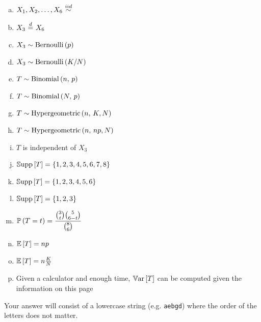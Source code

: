 \documentclass[12pt,landscape]{article}
\newcommand{\instr}{\small Your answer will consist of a lowercase string (e.g. \texttt{aebgd}) where the order of the letters does not matter. \normalsize}
\begin{document}
\vspace{-0.2cm}\benum{} 
\begin{enumerate}[(a)]
\item $X_1, X_2, \ldots, X_6 \iid$
\item $X_{3} \equalsindist X_6$
\item $X_{3} \sim \mathrm{Bernoulli}\left(p\right)$
\item $X_{3} \sim \mathrm{Bernoulli}\left(K/N\right)$
\item $T \sim \mathrm{Binomial}\left(n,\,p\right)$
\item $T \sim \mathrm{Binomial}\left(N,\,p\right)$
\item $T \sim \mathrm{Hypergeometric}\left(n,\,K,N\right)$ 
\item $T \sim \mathrm{Hypergeometric}\left(n,\,np,N\right)$ 
\item $T$ is independent of $X_{3}$
\item $\mathbb{S}\text{upp}\left[T\right] = \left\{1, 2, 3, 4, 5, 6, 7, 8\right\}$
\item $\mathbb{S}\text{upp}\left[T\right] = \left\{1, 2, 3, 4, 5, 6\right\}$
\item $\mathbb{S}\text{upp}\left[T\right] = \left\{1, 2, 3\right\}$
\item $\mathbb{P}\left(T = t\right) = \displaystyle \frac{\binom{3}{t}\binom{5}{6 - t}}{\binom{8}{6}}$
\item $\mathbb{E}\left[T\right] = np$
\item $\mathbb{E}\left[T\right] = n\frac{K}{N}$
\item Given a calculator and enough time, $\mathbb{V}\text{ar}\left[T\right]$ can be computed given the information on this page
\end{enumerate}
\eenum\instr\pagebreak
\end{document}
